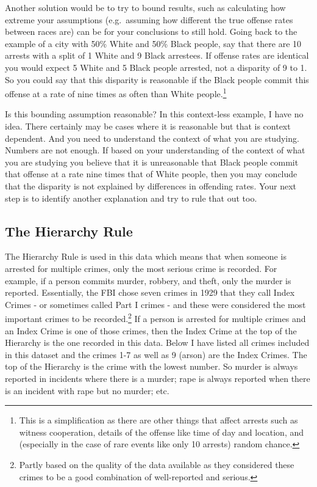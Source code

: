 \documentclass[
]{krantz}
\begin{document}
Another solution would be to try to bound results, such as
calculating how extreme your assumptions (e.g.~assuming how
different the true offense rates between races are) can be
for your conclusions to still hold. Going back to the
example of a city with 50\% White and 50\% Black people, say
that there are 10 arrests with a split of 1 White and 9
Black arrestees. If offense rates are identical you would
expect 5 White and 5 Black people arrested, not a disparity
of 9 to 1. So you could say that this disparity is
reasonable if the Black people commit this offense at a rate
of nine times as often than White people.\footnote{This is a
  simplification as there are other things that affect
  arrests such as witness cooperation, details of the
  offense like time of day and location, and (especially in
  the case of rare events like only 10 arrests) random
  chance.}

Is this bounding assumption reasonable? In this context-less
example, I have no idea. There certainly may be cases where
it is reasonable but that is context dependent. And you need
to understand the context of what you are studying. Numbers
are not enough. If based on your understanding of the
context of what you are studying you believe that it is
unreasonable that Black people commit that offense at a rate
nine times that of White people, then you may conclude that
the disparity is not explained by differences in offending
rates. Your next step is to identify another explanation and
try to rule that out too.

\subsection{The Hierarchy Rule}\label{the-hierarchy-rule}

The Hierarchy Rule is used in this data which means that
when someone is arrested for multiple crimes, only the most
serious crime is recorded. For example, if a person commits
murder, robbery, and theft, only the murder is reported.
Essentially, the FBI chose seven crimes in 1929 that they
call Index Crimes - or sometimes called Part I crimes - and
these were considered the most important crimes to be
recorded.\footnote{Partly based on the quality of the data
  available as they considered these crimes to be a good
  combination of well-reported and serious.} If a person is
arrested for multiple crimes and an Index Crime is one of
those crimes, then the Index Crime at the top of the
Hierarchy is the one recorded in this data. Below I have
listed all crimes included in this dataset and the crimes
1-7 as well as 9 (arson) are the Index Crimes. The top of
the Hierarchy is the crime with the lowest number. So murder
is always reported in incidents where there is a murder;
rape is always reported when there is an incident with rape
but no murder; etc.
\end{document}
